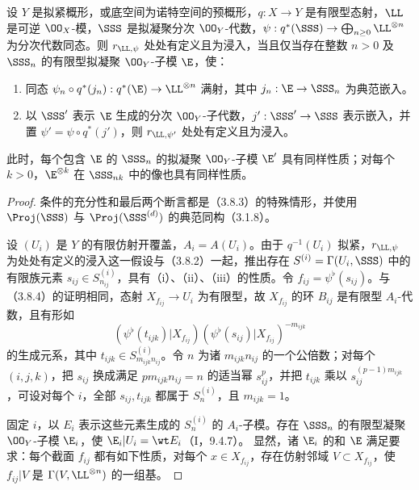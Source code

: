 设 $Y$ 是拟紧概形，或底空间为诺特空间的预概形，$q:X\to Y$ 是有限型态射，$\LL$ 是可逆 $\OO_X$-模，$\SSS$ 是拟凝聚分次 $\OO_Y$-代数，$\psi:q^*(\SSS)\to\bigoplus_{n\geq0}\LL^{\otimes n}$ 为分次代数同态。则 $r_{\LL,\psi}$ 处处有定义且为浸入，当且仅当存在整数 $n>0$ 及 $\SSS_n$ 的有限型拟凝聚 $\OO_Y$-子模 $\E$，使：
\begin{enumerate}[label=\alph*)]
\item 同态 $\psi_n\circ q^*(j_n):q^*(\E)\to\LL^{\otimes n}$ 满射，其中 $j_n:\E\to\SSS_n$ 为典范嵌入。
\item 以 $\SSS'$ 表示 $\E$ 生成的分次 $\OO_Y$-子代数，$j':\SSS'\to\SSS$ 表示嵌入，并置 $\psi'=\psi\circ q^*(j')$，则 $r_{\LL,\psi'}$ 处处有定义且为浸入。
\end{enumerate}
此时，每个包含 $\E$ 的 $\SSS_n$ 的拟凝聚 $\OO_Y$-子模 $\E'$ 具有同样性质；对每个 $k>0$，$\E^{\otimes k}$ 在 $\SSS_{nk}$ 中的像也具有同样性质。
\begin{proof}
条件的充分性和最后两个断言都是（3.8.3）的特殊情形，并使用 $\Proj(\SSS)$ 与 $\Proj(\SSS^{(d)})$ 的典范同构（3.1.8）。

设 $(U_i)$ 是 $Y$ 的有限仿射开覆盖，$A_i=A(U_i)$。由于 $q^{-1}(U_i)$ 拟紧，$r_{\LL,\psi}$ 为处处有定义的浸入这一假设与（3.8.2）一起，推出存在 $S^{(i)}=\Gamma(U_i,\SSS)$ 中的有限族元素 $s_{ij}\in S^{(i)}_{n_{ij}}$，具有（i）、（ii）、（iii）的性质。令 $f_{ij}=\psi^\flat(s_{ij})$。与（3.8.4）的证明相同，态射 $X_{f_{ij}}\to U_i$ 为有限型，故 $X_{f_{ij}}$ 的环 $B_{ij}$ 是有限型 $A_i$-代数，且有形如
\[
(\psi^\flat(t_{ijk})|X_{f_{ij}})
(\psi^\flat(s_{ij})|X_{f_{ij}})^{-m_{ijk}}
\]
的生成元系，其中 $t_{ijk}\in S^{(i)}_{m_{ijk}n_{ij}}$。令 $n$ 为诸 $m_{ijk}n_{ij}$ 的一个公倍数；对每个 $(i,j,k)$，把 $s_{ij}$ 换成满足 $p m_{ijk}n_{ij}=n$ 的适当幂 $s_{ij}^{p}$，并把 $t_{ijk}$ 乘以 $s_{ij}^{(p-1)m_{ijk}}$，可设对每个 $i$，全部 $s_{ij},t_{ijk}$ 都属于 $S^{(i)}_n$，且 $m_{ijk}=1$。

固定 $i$，以 $E_i$ 表示这些元素生成的 $S^{(i)}_n$ 的 $A_i$-子模。存在 $\SSS_n$ 的有限型凝聚 $\OO_Y$-子模 $\E_i$，使 $\E_i|U_i=\wt E_i$（I，9.4.7）。
显然，诸 $\E_i$ 的和 $\E$ 满足要求：每个截面 $f_{ij}$ 都有如下性质，对每个 $x\in X_{f_{ij}}$，存在仿射邻域 $V\subset X_{f_{ij}}$，使 $f_{ij}|V$ 是 $\Gamma(V,\LL^{\otimes n})$ 的一组基。
\end{proof}

